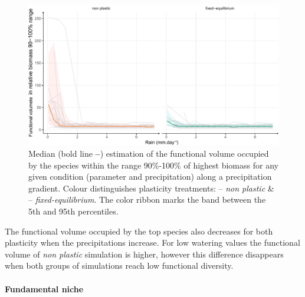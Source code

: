 \begin{figure}
\includegraphics[width = \textwidth]{./2_PP/Figures/Rain/gradient_plot_fdiv10.pdf}
\caption[Functional diversity of the best performing species along a precipitation gradient]{Median (bold line \textbf{--}) estimation of the functional volume occupied by the species within the range 90\%-100\% of highest biomass for any given condition (parameter and precipitation) along a precipitation gradient.  Colour distinguishes plasticity treatments: \textcolor{myOrange}{-- \textit{non plastic}} \&  \textcolor{myGreen}{-- \textit{fixed-equilibrium}}. The color ribbon marks the band between the 5th and 95th percentiles.}\label{fig:functional_div_grad} \end{figure}

The functional volume occupied by the top species also decreases for both plasticity when the precipitations increase. For low watering values the functional volume of \textit{non plastic} simulation is higher, however this difference disappears when both groups of simulations reach low functional diversity.

\paragraph{Fundamental niche}


